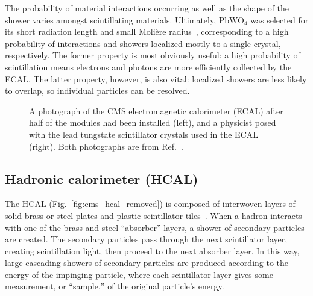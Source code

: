 The probability of material interactions occurring as well as the shape of the shower varies amongst scintillating materials. 
Ultimately, PbWO$_4$ was selected for its short radiation length and small Moli\`ere radius~\cite{CERN-LHCC-97-033}, corresponding to a high probability of interactions and showers localized mostly to a single crystal, respectively. 
The former property is most obviously useful: a high probability of scintillation means electrons and photons are more efficiently collected by the ECAL. 
The latter property, however, is also vital: localized showers are less likely to overlap, so individual particles can be resolved. 

\begin{figure}[htb]
    \centering
    \quad
    \caption[A photograph of the CMS electromagnetic calorimeter (ECAL) after half of the modules had been installed, and a physicist posed with the lead tungstate scintillator crystals used in the ECAL]{
        A photograph of the CMS electromagnetic calorimeter (ECAL) after half of the modules had been installed (left), and a physicist posed with the lead tungstate scintillator crystals used in the ECAL (right). 
        Both photographs are from Ref.~\cite{Brice:1431477}.
    }
    \label{fig:cms_ecal}
\end{figure}

\subsection{Hadronic calorimeter (HCAL)}
The HCAL (Fig.~\ref{fig:cms_hcal_removed}) is composed of interwoven layers of solid brass or steel plates and plastic scintillator tiles~\cite{CERN-LHCC-97-031}. 
When a hadron interacts with one of the brass and steel ``absorber'' layers, a shower of secondary particles are created. 
The secondary particles pass through the next scintillator layer, creating scintillation light, then proceed to the next absorber layer. 
In this way, large cascading showers of secondary particles are produced according to the energy of the impinging particle, where each scintillator layer gives some measurement, or ``sample,'' of the original particle's energy. 

